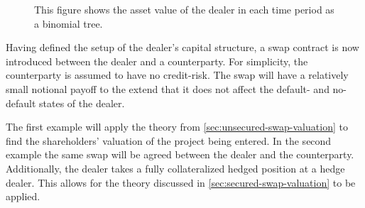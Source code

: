 \documentclass[main.tex]{subfiles}
\begin{document}
        \begin{figure}[H]
            \centering
            \caption{This figure shows the asset value of the dealer in each time period as a binomial tree.}
            \label{fig:example-asset-value-multi-period-dealer}
        \end{figure}

        Having defined the setup of the dealer's capital structure,
        a swap contract is now introduced between the dealer and a counterparty.
        For simplicity, the counterparty is assumed to have no credit-risk.
        The swap will have a relatively small notional payoff to the extend
        that it does not affect the default- and no-default states of the dealer.

        The first example will apply the theory from \cref{sec:unsecured-swap-valuation}
        to find the shareholders' valuation of the project being entered.
        In the second example the same swap will be agreed between the dealer and the counterparty.
        Additionally, the dealer takes a fully collateralized hedged position at a hedge dealer.
        This allows for the theory discussed in \cref{sec:secured-swap-valuation} to be applied.
\end{document}
